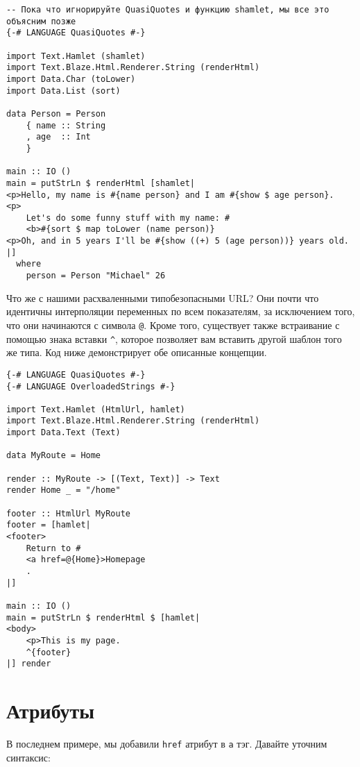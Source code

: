 \begin{lstlisting}
-- Пока что игнорируйте QuasiQuotes и функцию shamlet, мы все это объясним позже
{-# LANGUAGE QuasiQuotes #-}

import Text.Hamlet (shamlet)
import Text.Blaze.Html.Renderer.String (renderHtml)
import Data.Char (toLower)
import Data.List (sort)

data Person = Person
    { name :: String
    , age  :: Int
    }

main :: IO ()
main = putStrLn $ renderHtml [shamlet|
<p>Hello, my name is #{name person} and I am #{show $ age person}.
<p>
    Let's do some funny stuff with my name: #
    <b>#{sort $ map toLower (name person)}
<p>Oh, and in 5 years I'll be #{show ((+) 5 (age person))} years old.
|]
  where
    person = Person "Michael" 26
\end{lstlisting}

Что же с нашими расхваленными типобезопасными URL? Они почти что идентичны
интерполяции переменных по всем показателям, за исключением того, что они
начинаются с символа \texttt{@}. Кроме того, существует также встраивание с помощью
знака вставки \verb'^', которое позволяет вам вставить другой шаблон того же типа.
Код ниже демонстрирует обе описанные концепции.

\begin{lstlisting}
{-# LANGUAGE QuasiQuotes #-}
{-# LANGUAGE OverloadedStrings #-}

import Text.Hamlet (HtmlUrl, hamlet)
import Text.Blaze.Html.Renderer.String (renderHtml)
import Data.Text (Text)

data MyRoute = Home

render :: MyRoute -> [(Text, Text)] -> Text
render Home _ = "/home"

footer :: HtmlUrl MyRoute
footer = [hamlet|
<footer>
    Return to #
    <a href=@{Home}>Homepage
    .
|]

main :: IO ()
main = putStrLn $ renderHtml $ [hamlet|
<body>
    <p>This is my page.
    ^{footer}
|] render
\end{lstlisting}

\section{Атрибуты}
В последнем примере, мы добавили \texttt{href} атрибут в \texttt{a} тэг. Давайте
уточним синтаксис:

